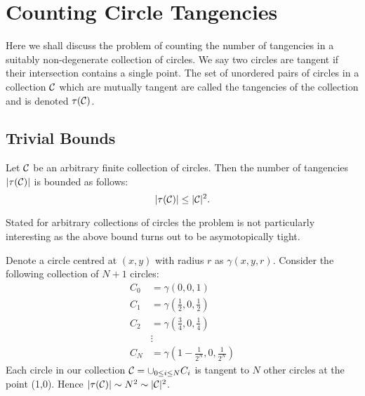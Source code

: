 \chapter{Counting Circle Tangencies}
Here we shall discuss the problem of counting the number of tangencies in a suitably non-degenerate collection of circles. We say two circles are tangent if their intersection contains a single point.
The set of unordered pairs of circles in a collection $\mathcal C$ which are mutually tangent are called the tangencies of the collection and is denoted $\tau(\mathcal C)$. 
\section{Trivial Bounds}
\begin{theorem}
    Let $\mathcal C$ be an arbitrary finite collection of circles. Then the number of tangencies $|\tau(\mathcal C)|$ is bounded as follows:
    \[
        |\tau(\mathcal C)| \leq |\mathcal C|^2.
    \] \label{thm:trivial-circle-bound}
\end{theorem}
Stated for arbitrary collections of circles the problem is not particularly interesting as the above bound turns out to be asymotopically tight. 
\begin{example}
Denote a circle centred at $(x,y)$ with radius $r$ as $\gamma (x,y,r)$. 
Consider the following collection of $N+1$ circles:
\begin{align*}
    C_0 &= \gamma\left(0,0,1\right) \\
    C_1 &= \gamma\left(\frac{1}{2},0,\frac{1}{2}\right) \\
    C_2 &= \gamma\left(\frac{3}{4},0, \frac{1}{4}\right) \\
    &\vdots \\
    C_N &= \gamma\left(1- \frac{1}{2^N}, 0, \frac{1}{2^N}\right)
\end{align*}
Each circle in our collection $\mathcal C = \cup_{0 \leq i \leq N} C_i$ is tangent to $N$ other circles at the point (1,0). 
Hence $|\tau(\mathcal C)| \sim N^2 \sim |\mathcal C|^2$. 
\end{example}

